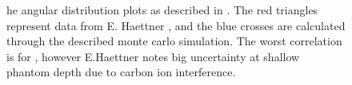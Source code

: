 \begin{figure}[!ht]
{\label{fig:D_31.2_1_N}
}
\label{fig:subfigureExample}
\caption[Optional caption for list of figures]{he angular distribution plots as described in \cite{AngularDistributionText}. The red triangles represent data from E. Haettner \cite{ehaettner}, and the blue crosses are calculated through the described monte carlo simulation. The worst correlation is for , however E.Haettner notes big uncertainty at shallow phantom depth due to carbon ion interference.}
\end{figure}
\clearpage
